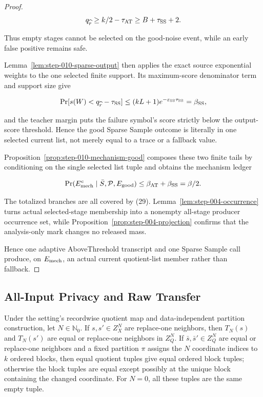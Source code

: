 \begin{proof}
\[
 q_{\widehat r}\geq k/2-\tau_{\rm AT}
 \geq B+\tau_{\rm SS}+2.
\]

Thus empty stages cannot be selected on the good-noise event, while an
early false positive remains safe.

Lemma~\ref{lem:step-010-sparse-output} then applies the exact source
exponential weights to the one selected finite support. Its maximum-score
denominator term and support size give

\[
 \Pr[s(W)<q_{\widehat r}-\tau_{\rm SS}]
 \leq(kL+1)e^{-\varepsilon_{\rm SS}\tau_{\rm SS}}
 =\beta_{\rm SS},
\]

and the teacher margin puts the failure symbol's score strictly below the
 output-score threshold. Hence the good Sparse Sample outcome is
literally in one selected current list, not merely equal to a trace or a
fallback value.

Proposition~\ref{prop:step-010-mechanism-good} composes these two finite
tails by conditioning on the single selected list tuple and obtains the
mechanism ledger

\[
 \Pr(E_{\rm mech}^c\mid\bar S,\mathcal P,E_{\rm good})
 \leq\beta_{\rm AT}+\beta_{\rm SS}=\beta/2.
\]

The totalized branches are all covered by (29). Lemma~\ref{lem:step-004-occurrence} turns actual selected-stage membership
into a nonempty all-stage producer occurrence set, while Proposition~\ref{prop:step-004-projection} confirms that the analysis-only
mark changes no released mass.

Hence one adaptive AboveThreshold transcript and one Sparse Sample call
produce, on \(E_{\rm mech}\), an actual current quotient-list member rather
than fallback.



\end{proof}

\subsection{All-Input Privacy and Raw Transfer}\label{app:step_011}


\begin{lemma}\label{lem:step-011-record-locality}
Under the setting's recordwise quotient map and data-independent partition
construction, let \(N\in\mathbb N_0\). If \(s,s'\in Z_X^N\) are replace-one
neighbors, then \(T_N(s)\) and \(T_N(s')\) are equal or replace-one neighbors
in \(Z_Q^N\). If \(\bar s,\bar s'\in Z_Q^N\) are equal or replace-one
neighbors and a fixed partition \(\pi\) assigns the \(N\) coordinate indices
to \(k\) ordered blocks, then equal quotient tuples give equal ordered block
tuples; otherwise the block tuples are equal except possibly at the unique
block containing the changed coordinate. For \(N=0\), all these tuples are
the same empty tuple.


\end{lemma}

